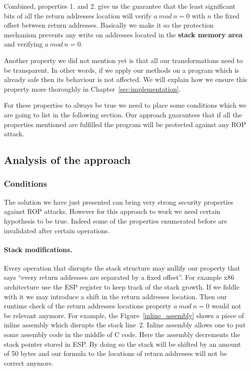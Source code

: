 \documentclass[11pt]{sdm}
\begin{document}
Combined, properties 1. and 2. give us the guarantee that the least significant bits of all the return addresses location will verify $a~mod~n=0$ with $n$ the fixed offset between return addresses.
Basically we make it so the protection mechanism prevents any write on addresses located in the \textbf{stack memory area} and verifying $a~mod~n=0$.

\hfill \break 
Another property we did not mention yet is that all our transformations need to be transparent. In other words, if we apply our methods on a program which is already safe then its behaviour is not affected. We will explain how we ensure this property more thoroughly in Chapter~\ref{sec:implementation}.

\hfill \break 
For these properties to always be true we need to place some conditions which we are going to list in the following section. Our approach guarantees that if all the properties mentioned are fulfilled the program will be protected against any ROP attack.

\subsection{Analysis of the approach}
\label{sub:Analysis of the approach}

\subsubsection{Conditions}
\label{ssub:Conditions}

The solution we have just presented can bring very strong security properties against ROP attacks. However for this approach to work we need certain hypothesis to be true. Indeed some of the properties enumerated before are invalidated after certain operations.

\paragraph{Stack modifications.}
\label{par:Stack modifications}
Every operation that disrupts the stack structure may nullify our property that says ``every return addresses are separated by a fixed offset''. For example x86 architecture use the ESP register to keep track of the stack growth. If we fiddle with it we may introduce a shift in the return addresses location. Then our runtime check of the return addresses locations property $a~mod~n=0$ would not be relevant anymore.
		For example, the Figure~\ref{inline_assembly} shows a piece of inline assembly which disrupts the stack line~2. Inline assembly allows one to put some assembly code in the middle of C code. Here the assembly decrements the stack pointer stored in ESP. By doing so the stack will be shifted by an amount of 50 bytes and our formula to the locations of return addresses will not be correct anymore.
\end{document}
